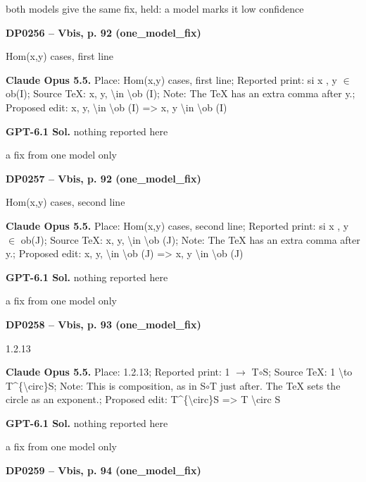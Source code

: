 both models give the same fix, held: a model marks it low confidence\par
\par\noindent\hypertarget{DP0256}{}\textbf{DP0256 -- Vbis, p. 92 (one\_model\_fix)}\par
Hom(x,y) cases, first line\par
\textbf{Claude Opus 5.5.} Place: Hom(x,y) cases, first line; Reported print: si x , y \ensuremath{\in} ob(I); Source TeX: x, y, \textbackslash{}in \textbackslash{}ob (I); Note: The TeX has an extra comma after y.; Proposed edit: x, y, \textbackslash{}in \textbackslash{}ob (I) =\allowbreak > x, y \textbackslash{}in \textbackslash{}ob (I)\par
\textbf{GPT-6.1 Sol.} nothing reported here\par
a fix from one model only\par
\par\noindent\hypertarget{DP0257}{}\textbf{DP0257 -- Vbis, p. 92 (one\_model\_fix)}\par
Hom(x,y) cases, second line\par
\textbf{Claude Opus 5.5.} Place: Hom(x,y) cases, second line; Reported print: si x , y \ensuremath{\in} ob(J); Source TeX: x, y, \textbackslash{}in \textbackslash{}ob (J); Note: The TeX has an extra comma after y.; Proposed edit: x, y, \textbackslash{}in \textbackslash{}ob (J) =\allowbreak > x, y \textbackslash{}in \textbackslash{}ob (J)\par
\textbf{GPT-6.1 Sol.} nothing reported here\par
a fix from one model only\par
\par\noindent\hypertarget{DP0258}{}\textbf{DP0258 -- Vbis, p. 93 (one\_model\_fix)}\par
1.2.13\par
\textbf{Claude Opus 5.5.} Place: 1.2.13; Reported print: 1 \ensuremath{\longrightarrow} T\ensuremath{\circ}S; Source TeX: 1 \textbackslash{}to T\textasciicircum{}\{\textbackslash{}circ\}S; Note: This is composition, as in S\ensuremath{\circ}T just after. The TeX sets the circle as an exponent.; Proposed edit: T\textasciicircum{}\{\textbackslash{}circ\}S =\allowbreak > T \textbackslash{}circ S\par
\textbf{GPT-6.1 Sol.} nothing reported here\par
a fix from one model only\par
\par\noindent\hypertarget{DP0259}{}\textbf{DP0259 -- Vbis, p. 94 (one\_model\_fix)}\par

